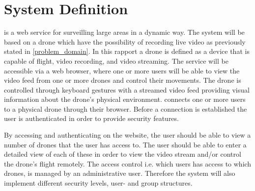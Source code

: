 \section{System Definition}
\projectname{} is a web service for surveilling large areas in a dynamic way. 
The system will be based on a drone which have the possibility of recording live video as previously stated in \ref{problem_domain}.
In this rapport a drone is defined as a device that is capable of flight, video recording, and video streaming.
The service will be accessible via a web browser, where one or more users will be able to view the video feed from one or more drones and control their movements. 
The drone is controlled through keyboard gestures with a streamed video feed providing visual information about the drone's physical environment. 
\projectname{} connects one or more users to a physical drone through their browser. 
Before a connection is established the user is authenticated in order to provide security features.

By accessing and authenticating on the website, the user should be able to view a number of drones that the user has access to.
The user should be able to enter a detailed view of each of these in order to view the video stream and/or control the drone's flight remotely. 
The access control i.e. which users has access to which drones, is managed by an administrative user.
Therefore the system will also implement different security levels, user- and group structures. 
